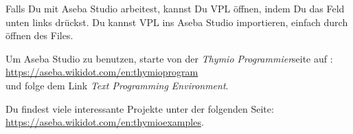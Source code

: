 Falls Du mit Aseba Studio arbeitest, kannst Du VPL öffnen, indem Du das Feld  unten links drückst. Du kannst VPL ins Aseba Studio importieren, einfach durch öffnen des Files.

Um Aseba Studio zu benutzen, starte von der \emph{Thymio Programmier}seite auf :\\
\url{https://aseba.wikidot.com/en:thymioprogram}\\
und folge dem Link \emph{Text Programming Environment}.

Du findest viele interessante Projekte unter der folgenden Seite:\\\url{https://aseba.wikidot.com/en:thymioexamples}.

\vspace{4em}

